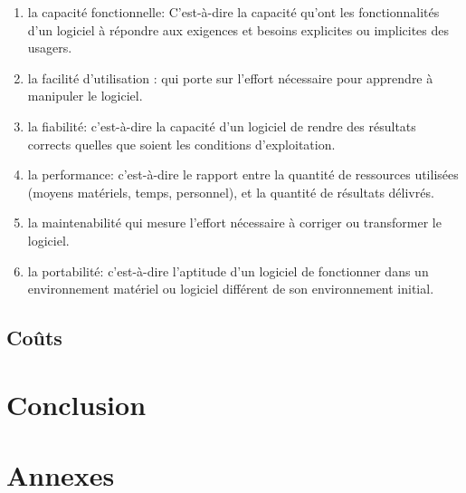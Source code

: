 \documentclass{scrartcl}
\begin{document}
\begin{enumerate}
	\item la capacité fonctionnelle:
C'est-à-dire la capacité qu'ont les fonctionnalités d'un logiciel à répondre aux exigences et besoins explicites ou implicites des usagers.
	\item la facilité d'utilisation :
qui porte sur l'effort nécessaire pour apprendre à manipuler le logiciel.
	\item la fiabilité:
c'est-à-dire la capacité d'un logiciel de rendre des résultats corrects quelles que soient les conditions d'exploitation.
	\item la performance:
c'est-à-dire le rapport entre la quantité de ressources utilisées (moyens matériels, temps, personnel), et la quantité de résultats délivrés.
	\item la maintenabilité
qui mesure l'effort nécessaire à corriger ou transformer le logiciel.
	\item la portabilité:
c'est-à-dire l'aptitude d'un logiciel de fonctionner dans un environnement matériel ou logiciel différent de son environnement initial.
\end{enumerate}

\subsection{Coûts}
\paragraph{}

\newpage


\section{Conclusion}
\paragraph{}

\newpage


\section{Annexes}
\end{document}
